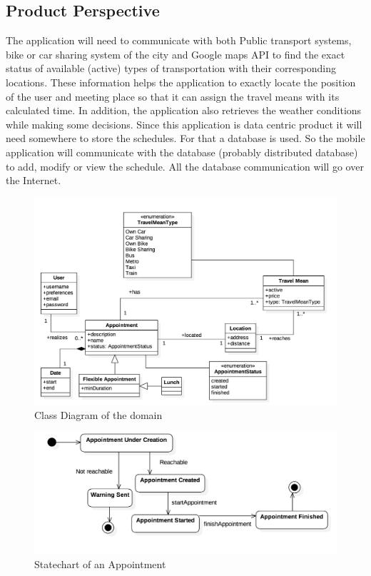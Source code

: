 \documentclass[12pt]{article}
\begin{document}
\subsection{Product Perspective}
The application will need to communicate with both Public transport systems, bike or car sharing system of the city and Google maps API to find the exact status of available (active) types of transportation with their corresponding locations. These information helps the application to exactly locate the position of the user and meeting place so that it can assign the travel means with its calculated time. In addition, the application also retrieves the weather conditions while making some decisions. 
Since this application is data centric product it will need somewhere to store the schedules. For that a database is used. So the mobile application will communicate with the database (probably distributed database) to add, modify or view the schedule. All the database communication will go over the Internet.
    \begin{figure}[H]
        \includegraphics[scale=0.27]{domainModel.png}
        \caption{Class Diagram of the domain}
        \centering
    \label{fig:domainModel}
    \end{figure}
    \begin{figure}[H]
    \centering
        \includegraphics[scale=0.4]{statechartAppointment.png}
        \caption{Statechart of an Appointment}
    \label{fig:domainModel}
    \end{figure}
    
\end{document}

